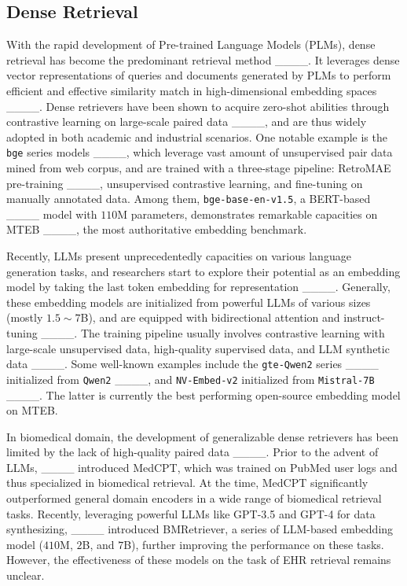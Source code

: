\subsection{Dense Retrieval}
With the rapid development of Pre-trained Language Models (PLMs), dense retrieval has become the predominant retrieval method ____.
It leverages dense vector representations of queries and documents generated by PLMs to perform efficient and effective similarity match in high-dimensional embedding spaces ____.
Dense retrievers have been shown to acquire zero-shot abilities through contrastive learning on large-scale paired data ____, and are thus widely adopted in both academic and industrial scenarios.
One notable example is the \texttt{bge} series models ____, which leverage vast amount of unsupervised pair data mined from web corpus, and are trained with a three-stage pipeline: RetroMAE pre-training ____, unsupervised contrastive learning, and fine-tuning on manually annotated data.
Among them, \texttt{bge-base-en-v1.5}, a BERT-based ____ model with $110$M parameters, demonstrates remarkable capacities on MTEB ____, the most authoritative embedding benchmark. 

Recently, LLMs present unprecedentedly capacities on various language generation tasks, and researchers start to explore their potential as an embedding model by taking the last token embedding for representation ____.
Generally, these embedding models are initialized from powerful LLMs of various sizes (mostly $1.5\sim 7$B), and are equipped with bidirectional attention and instruct-tuning ____.
The training pipeline usually involves contrastive learning with large-scale unsupervised data, high-quality supervised data, and LLM synthetic data ____.
Some well-known examples include the \texttt{gte-Qwen2} series ____ initialized from \texttt{Qwen2} ____, and \texttt{NV-Embed-v2} initialized from \texttt{Mistral-7B} ____.
The latter is currently the best performing open-source embedding model on MTEB.

In biomedical domain, the development of generalizable dense retrievers has been limited by the lack of high-quality paired data ____.
Prior to the advent of LLMs, ____ introduced MedCPT, which was trained on PubMed user logs and thus specialized in biomedical retrieval.
At the time, MedCPT significantly outperformed general domain encoders in a wide range of biomedical retrieval tasks.
Recently, leveraging powerful LLMs like GPT-3.5 and GPT-4 for data synthesizing, ____ introduced BMRetriever, a series of LLM-based embedding model ($410$M, $2$B, and $7$B), further improving the performance on these tasks.
However, the effectiveness of these models on the task of EHR retrieval remains unclear.